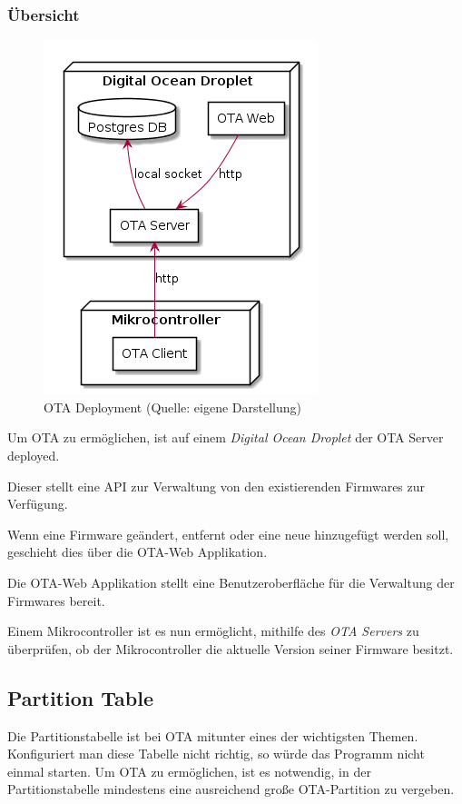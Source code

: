 \subsubsection{Übersicht}
\begin{figure}[H]
    \begin{center}
        \includegraphics[scale=0.6]{diagrams/ota_deployment.png}
        \caption{OTA Deployment (Quelle: eigene Darstellung)}
    \end{center}
\end{figure}

Um OTA zu ermöglichen, ist auf einem \textit{Digital Ocean Droplet} der OTA Server deployed. 

Dieser stellt eine API zur Verwaltung von den existierenden Firmwares zur Verfügung.  

Wenn eine Firmware geändert, entfernt oder eine neue hinzugefügt werden soll, geschieht dies über die OTA-Web Applikation.

Die OTA-Web Applikation stellt eine Benutzeroberfläche für die Verwaltung der Firmwares bereit.

Einem Mikrocontroller ist es nun ermöglicht, mithilfe des \textit{OTA Servers} zu überprüfen, ob der Mikrocontroller die aktuelle Version seiner Firmware besitzt.

\subsection{Partition Table}\label{sec:ota-partition-table}
Die Partitionstabelle ist bei OTA mitunter eines der wichtigsten Themen.
Konfiguriert man diese Tabelle nicht richtig, so würde das Programm nicht einmal starten. 
Um OTA zu ermöglichen, ist es notwendig, in der Partitionstabelle mindestens eine ausreichend große OTA-Partition zu vergeben.

